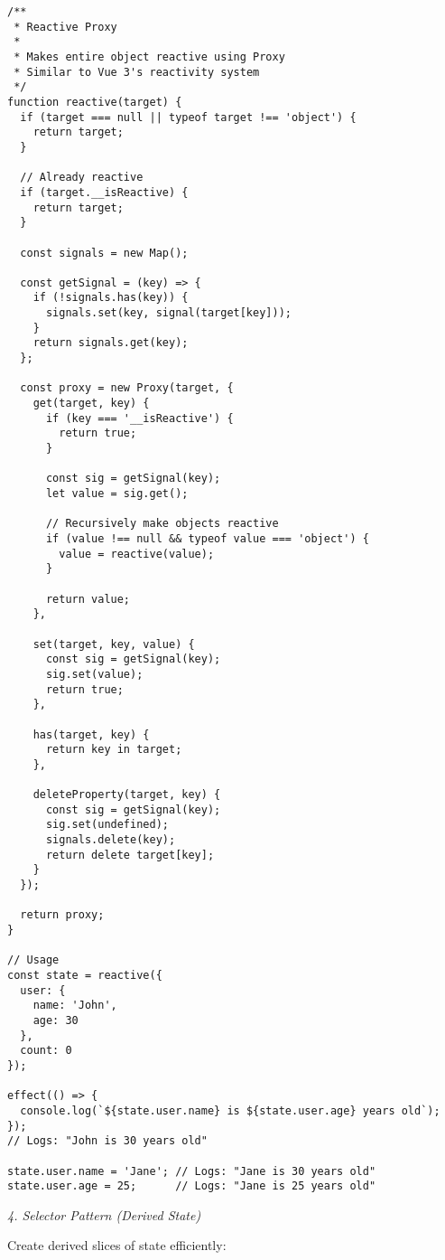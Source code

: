 \documentclass[11pt]{article}
\begin{document}
\begin{verbatim}
/**
 * Reactive Proxy
 * 
 * Makes entire object reactive using Proxy
 * Similar to Vue 3's reactivity system
 */
function reactive(target) {
  if (target === null || typeof target !== 'object') {
    return target;
  }
  
  // Already reactive
  if (target.__isReactive) {
    return target;
  }
  
  const signals = new Map();
  
  const getSignal = (key) => {
    if (!signals.has(key)) {
      signals.set(key, signal(target[key]));
    }
    return signals.get(key);
  };
  
  const proxy = new Proxy(target, {
    get(target, key) {
      if (key === '__isReactive') {
        return true;
      }
      
      const sig = getSignal(key);
      let value = sig.get();
      
      // Recursively make objects reactive
      if (value !== null && typeof value === 'object') {
        value = reactive(value);
      }
      
      return value;
    },
    
    set(target, key, value) {
      const sig = getSignal(key);
      sig.set(value);
      return true;
    },
    
    has(target, key) {
      return key in target;
    },
    
    deleteProperty(target, key) {
      const sig = getSignal(key);
      sig.set(undefined);
      signals.delete(key);
      return delete target[key];
    }
  });
  
  return proxy;
}

// Usage
const state = reactive({
  user: {
    name: 'John',
    age: 30
  },
  count: 0
});

effect(() => {
  console.log(`${state.user.name} is ${state.user.age} years old`);
});
// Logs: "John is 30 years old"

state.user.name = 'Jane'; // Logs: "Jane is 30 years old"
state.user.age = 25;      // Logs: "Jane is 25 years old"
\end{verbatim}

\emph{4. Selector Pattern (Derived State)}

Create derived slices of state efficiently:
\end{document}
